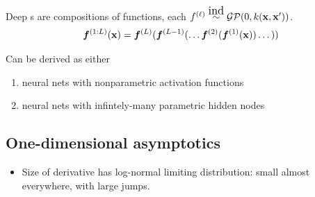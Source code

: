 \documentclass[portrait,a0b,final,a4resizeable]{include/a0poster}
\begin{document}
\begin{poster}
\begin{multicols}{2}
\vspace{0.5in} 


Deep \gp{}s are compositions of functions, each $f^{(\ell)} \simind \GPt{0}{k(\vx, \vx')}$. 
\begin{align*}
\boldsymbol{f}^{(1:L)}(\mathbf{x}) = \boldsymbol{f}^{(L)}(\boldsymbol{f}^{(L-1)}(\dots \boldsymbol{f}^{(2)}(\boldsymbol{f}^{(1)}(\mathbf{x})) \dots))
\end{align*}
%

Can be derived as either
\begin{enumerate}
	\item  neural nets with nonparametric activation functions
    \item  neural nets with infintely-many parametric hidden nodes
\end{enumerate}




\subsection*{One-dimensional asymptotics}

\begin{itemize}
\item Size of derivative has log-normal limiting distribution:
small almost everywhere, with large jumps.
\end{itemize}

\newcommand{\onedsamplepic}[1]{
\hspace{-0.2in}
\texttt{[image: ../figures/1d\_samples/latent\_seed\_0\_1d\_large/layer-\#1]}} 
\newcommand{\onedsamplepiccon}[1]{
\hspace{-0.2in}
\texttt{[image: ../figures/1d\_samples/latent\_seed\_0\_1d\_large\_connected/layer-\#1]}} 


\end{multicols}
\end{poster}
\end{document}
